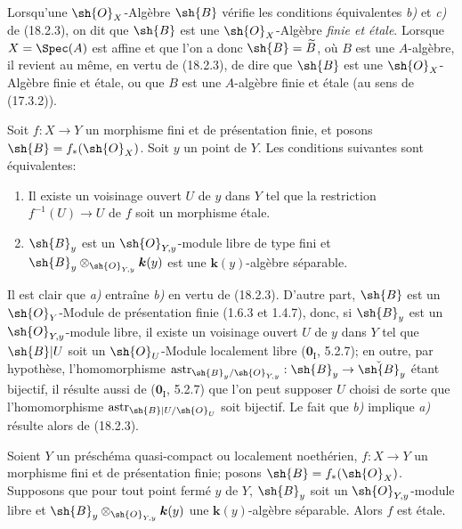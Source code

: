 Lorsqu'une $\sh{O}_X$-Algèbre $\sh{B}$ vérifie les conditions équivalentes \emph{b)} et \emph{c)} de (18.2.3), on dit que $\sh{B}$ est une $\sh{O}_X$-Algèbre \emph{finie et étale}. Lorsque $X=\Spec(A)$ est affine et que l'on a donc $\sh{B}=\widetilde B$, où $B$ est une $A$-algèbre, il revient au même, en vertu de (18.2.3), de dire que $\sh{B}$ est une $\sh{O}_X$-Algèbre finie et étale, ou que $B$ est une $A$-algèbre finie et étale (au sens de (17.3.2)).

\begin{corollary}[18.2.4]
\label{IV.18.2.4}
Soit $f:X\to Y$ un morphisme fini et de présentation finie, et posons $\sh{B}=f_*(\sh{O}_X)$. Soit $y$ un point de $Y$. Les conditions suivantes sont équivalentes:
\begin{enumerate}
  \item[\textup{a)}] Il existe un voisinage ouvert $U$ de $y$ dans $Y$ tel que la restriction $f^{-1}(U)\to U$ de $f$ soit un morphisme étale.
  \item[\textup{b)}] $\sh{B}_y$ est un $\sh{O}_{Y,y}$-module libre de type fini et $\sh{B}_y\otimes_{\sh{O}_{Y,y}}\boldsymbol{k}(y)$ est une $\boldsymbol{k}(y)$-algèbre séparable.
\end{enumerate}
\end{corollary}

Il est clair que \emph{a)} entraîne \emph{b)} en vertu de (18.2.3). D'autre part, $\sh{B}$ est un $\sh{O}_Y$-Module de présentation finie (1.6.3 et 1.4.7), donc, si $\sh{B}_y$ est un $\sh{O}_{Y,y}$-module libre, il existe un voisinage ouvert $U$ de $y$ dans $Y$ tel que $\sh{B}|U$ soit un $\sh{O}_U$-Module localement libre ($\mathbf{0}_{\mathrm I}$, 5.2.7); en outre, par hypothèse, l'homomorphisme $\operatorname{astr}_{\sh{B}_y/\sh{O}_{Y,y}}:\sh{B}_y\to\check{\sh{B}}_y$ étant bijectif, il résulte aussi de ($\mathbf{0}_{\mathrm I}$, 5.2.7) que l'on peut supposer $U$ choisi de sorte que
l'homomorphisme $\operatorname{astr}_{\sh{B}|U/\sh{O}_U}$ soit bijectif. Le fait que \emph{b)} implique \emph{a)} résulte alors de (18.2.3).

\begin{corollary}[18.2.5]
\label{IV.18.2.5}
Soient $Y$ un préschéma quasi-compact ou localement noethérien, $f:X\to Y$ un morphisme fini et de présentation finie; posons $\sh{B}=f_*(\sh{O}_X)$. Supposons que pour tout point fermé $y$ de $Y$, $\sh{B}_y$ soit un $\sh{O}_{Y,y}$-module libre et $\sh{B}_y\otimes_{\sh{O}_{Y,y}}\boldsymbol{k}(y)$ une $\boldsymbol{k}(y)$-algèbre séparable. Alors $f$ est étale.
\end{corollary}

